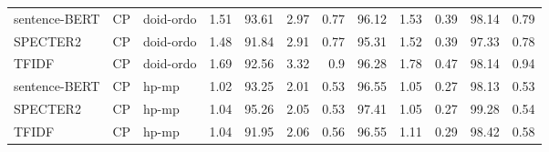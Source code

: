 \begin{table}[h]
\begin{tabular}{|l|c|l|r|r|r|r|r|r|r|r|r|}
	\hline
	sentence-BERT  & CP & doid-ordo  & 1.51 & 93.61 & 2.97 & 0.77 & 96.12 & 1.53 & 0.39 & 98.14 & 0.79\\
	SPECTER2  & CP & doid-ordo  & 1.48 & 91.84 & 2.91 & 0.77 & 95.31 & 1.52 & 0.39 & 97.33 & 0.78\\
	TFIDF  & CP & doid-ordo  & 1.69 & 92.56 & 3.32 & 0.9 & 96.28 & 1.78 & 0.47 & 98.14 & 0.94\\
	\hline
	sentence-BERT  & CP & hp-mp  & 1.02 & 93.25 & 2.01 & 0.53 & 96.55 & 1.05 & 0.27 & 98.13 & 0.53\\
	SPECTER2  & CP & hp-mp  & 1.04 & 95.26 & 2.05 & 0.53 & 97.41 & 1.05 & 0.27 & 99.28 & 0.54\\
	TFIDF  & CP & hp-mp  & 1.04 & 91.95 & 2.06 & 0.56 & 96.55 & 1.11 & 0.29 & 98.42 & 0.58\\
	\hline
    \end{tabular}
\end{table}

